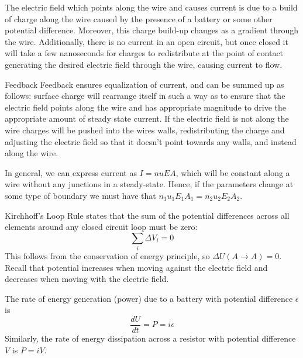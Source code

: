 \documentclass[12pt]{report}
\begin{document}
\begin{rmk}{}{}
        The electric field which points along the wire and causes current is due to a build of charge along the wire caused by the presence of a battery or some other potential difference. Moreover, this charge build-up changes as a gradient through the wire. Additionally, there is no current in an open circuit, but once closed it will take a few nanoseconds for charges to redistribute at the point of contact generating the desired electric field through the wire, causing current to flow.
\end{rmk}


\begin{defn}{Feedback}{}
        Feedback ensures equalization of current, and can be summed up as follows: surface charge will rearrange itself in such a way as to ensure that the electric field points along the wire and has appropriate magnitude to drive the appropriate amount of steady state current. If the electric field is not along the wire charges will be pushed into the wires walls, redistributing the charge and adjusting the electric field so that it doesn't point towards any walls, and instead along the wire.
\end{defn}


\begin{rmk}{}{}
        In general, we can express current as $I = nuEA$, which will be constant along a wire without any junctions in a steady-state. Hence, if the parameters change at some type of boundary we must have that $n_1u_1E_1A_1 = n_2u_2E_2A_2$.
\end{rmk}


\begin{thm}{Kirchhoff's Loop Rule}{}
         states that the sum of the potential differences across all elements around any closed circuit loop must be zero:\begin{equation}
                \sum_i\Delta V_i = 0
        \end{equation}
        This follows from the conservation of energy principle, so $\Delta U(A \rightarrow A) = 0$. Recall that potential increases when moving against the electric field and decreases when moving with the electric field.
\end{thm}


\begin{defn}{}{}
        The rate of energy generation (power) due to a battery with potential difference $\epsilon$ is \begin{equation}
                \frac{dU}{dt} = P = i\epsilon
        \end{equation}
        Similarly, the rate of energy dissipation across a resistor with potential difference $V$ is $P = iV$.
\end{defn}
\end{document}
